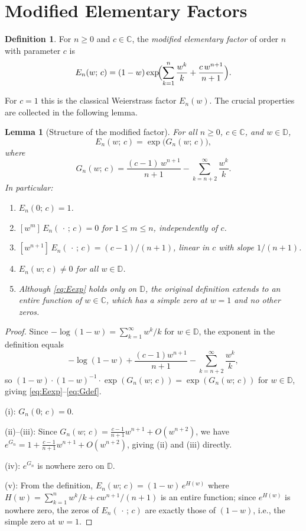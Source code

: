 \documentclass[12pt]{amsart}
\newtheorem{lemma}[theorem]{Lemma}
\theoremstyle{definition}
\newtheorem{definition}[theorem]{Definition}
\newcommand{\D}{\mathbb{D}}
\newcommand{\C}{\mathbb{C}}
\begin{document}
\section{Modified Elementary Factors}
\label{sec:factors}

\begin{definition}
For $n \geq 0$ and $c \in \C$, the \emph{modified elementary factor}
of order $n$ with parameter $c$ is
\[
  E_n(w;\,c)
  = (1-w)\exp\!\Bigl(\sum_{k=1}^{n}\frac{w^k}{k} + \frac{c\,w^{n+1}}{n+1}\Bigr).
\]
\end{definition}

For $c = 1$ this is the classical Weierstrass factor $E_n(w)$.  The
crucial properties are collected in the following lemma.

\begin{lemma}[Structure of the modified factor]
\label{lem:structure}
For all $n \geq 0$, $c \in \C$, and $w \in \D$,
\begin{equation}
\label{eq:Eexp}
  E_n(w;\,c) = \exp\bigl(G_n(w;\,c)\bigr),
\end{equation}
where
\begin{equation}
\label{eq:Gdef}
  G_n(w;\,c)
  = \frac{(c-1)\,w^{n+1}}{n+1} - \sum_{k=n+2}^{\infty}\frac{w^k}{k}.
\end{equation}
In particular:
\begin{enumerate}
\item[(i)] $E_n(0;\,c) = 1$.
\item[(ii)] $[w^m]\,E_n(\,\cdot\,;\,c) = 0$ for $1 \leq m \leq n$,
  independently of $c$.
\item[(iii)] $[w^{n+1}]\,E_n(\,\cdot\,;\,c) = (c-1)/(n+1)$,
  linear in $c$ with slope $1/(n+1)$.
\item[(iv)] $E_n(w;\,c) \neq 0$ for all $w \in \D$.
\item[(v)] Although \eqref{eq:Eexp} holds only on $\D$, the original
  definition extends to an entire function of $w \in \C$, which has a
  simple zero at $w = 1$ and no other zeros.
\end{enumerate}
\end{lemma}

\begin{proof}
Since $-\log(1-w) = \sum_{k=1}^{\infty} w^k/k$ for $w \in \D$, the
exponent in the definition equals
\[
  -\log(1-w) + \frac{(c-1)w^{n+1}}{n+1} - \sum_{k=n+2}^{\infty}\frac{w^k}{k},
\]
so $(1-w)\cdot(1-w)^{-1}\cdot\exp(G_n(w;\,c)) = \exp(G_n(w;\,c))$
for $w \in \D$, giving \eqref{eq:Eexp}--\eqref{eq:Gdef}.

(i): $G_n(0;\,c) = 0$.

(ii)--(iii): Since $G_n(w;\,c) = \tfrac{c-1}{n+1}w^{n+1} + O(w^{n+2})$,
we have $e^{G_n} = 1 + \tfrac{c-1}{n+1}w^{n+1} + O(w^{n+2})$,
giving (ii) and (iii) directly.

(iv): $e^{G_n}$ is nowhere zero on $\D$.

(v): From the definition, $E_n(w;\,c) = (1-w)\,e^{H(w)}$ where
$H(w) = \sum_{k=1}^n w^k/k + cw^{n+1}/(n+1)$ is an entire function;
since $e^{H(w)}$ is nowhere zero, the zeros of $E_n(\,\cdot\,;\,c)$ are
exactly those of $(1-w)$, i.e., the simple zero at $w=1$.
\end{proof}
\end{document}
